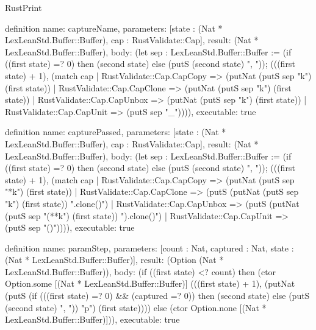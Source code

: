 \begin{lexlean}{RustPrint}
\begin{semanticmodule}
definition{
  name: captureName,
  parameters: [state : (Nat * LexLeanStd.Buffer::Buffer), cap : RustValidate::Cap],
  result: (Nat * LexLeanStd.Buffer::Buffer),
  body: (let sep : LexLeanStd.Buffer::Buffer := (if ((first state) =? 0) then (second state) else (putS (second state) ", ")); (((first state) + 1), (match cap
    | RustValidate::Cap.CapCopy => (putNat (putS sep "k") (first state))
    | RustValidate::Cap.CapClone => (putNat (putS sep "k") (first state))
    | RustValidate::Cap.CapUnbox => (putNat (putS sep "k") (first state))
    | RustValidate::Cap.CapUnit => (putS sep "_")))),
  executable: true
}

definition{
  name: capturePassed,
  parameters: [state : (Nat * LexLeanStd.Buffer::Buffer), cap : RustValidate::Cap],
  result: (Nat * LexLeanStd.Buffer::Buffer),
  body: (let sep : LexLeanStd.Buffer::Buffer := (if ((first state) =? 0) then (second state) else (putS (second state) ", ")); (((first state) + 1), (match cap
    | RustValidate::Cap.CapCopy => (putNat (putS sep "*k") (first state))
    | RustValidate::Cap.CapClone => (putS (putNat (putS sep "k") (first state)) ".clone()")
    | RustValidate::Cap.CapUnbox => (putS (putNat (putS sep "(**k") (first state)) ").clone()")
    | RustValidate::Cap.CapUnit => (putS sep "()")))),
  executable: true
}

definition{
  name: paramStep,
  parameters: [count : Nat, captured : Nat, state : (Nat * LexLeanStd.Buffer::Buffer)],
  result: (Option (Nat * LexLeanStd.Buffer::Buffer)),
  body: (if ((first state) <? count) then (ctor Option.some [(Nat * LexLeanStd.Buffer::Buffer)] (((first state) + 1), (putNat (putS (if (((first state) =? 0) && (captured =? 0)) then (second state) else (putS (second state) ", ")) "p") (first state)))) else (ctor Option.none [(Nat * LexLeanStd.Buffer::Buffer)])),
  executable: true
}


\end{semanticmodule}
\end{lexlean}
